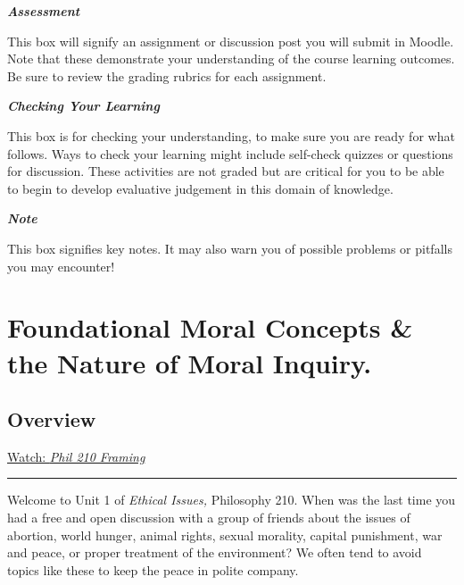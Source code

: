\documentclass[
]{book}
\begin{document}
\begin{assessment}
\textbf{\emph{Assessment}}

This box will signify an assignment or discussion post you will submit in Moodle. Note that these demonstrate your understanding of the course learning outcomes. Be sure to review the grading rubrics for each assignment.
\end{assessment}

\begin{progress}
\textbf{\emph{Checking Your Learning}}

This box is for checking your understanding, to make sure you are ready for what follows. Ways to check your learning might include self-check quizzes or questions for discussion. These activities are not graded but are critical for you to be able to begin to develop evaluative judgement in this domain of knowledge.
\end{progress}

\begin{caution}
\textbf{\emph{Note}}

This box signifies key notes. It may also warn you of possible problems or pitfalls you may encounter!
\end{caution}

\hypertarget{foundational-moral-concepts-the-nature-of-moral-inquiry.}{%
\chapter{Foundational Moral Concepts \& the Nature of Moral Inquiry.}\label{foundational-moral-concepts-the-nature-of-moral-inquiry.}}

\hypertarget{overview}{%
\section*{Overview}\label{overview}}

\href{https://vimeo.com/861713419/4d5e72685d}{Watch: \emph{Phil 210 Framing}}

\begin{center}\rule{0.5\linewidth}{0.5pt}\end{center}

Welcome to Unit 1 of \emph{Ethical Issues,} Philosophy 210. When was the last time you had a free and open discussion with a group of friends about the issues of abortion, world hunger, animal rights, sexual morality, capital punishment, war and peace, or proper treatment of the environment? We often tend to avoid topics like these to keep the peace in polite company.
\end{document}

